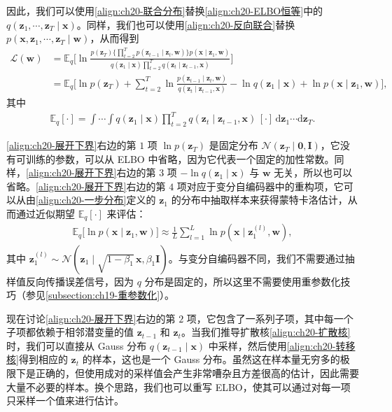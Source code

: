 \documentclass[../../main.tex]{subfiles}
\begin{document}
因此，我们可以使用\eqref{align:ch20-联合分布}替换\eqref{align:ch20-ELBO恒等}中的 $q(\bm{z}_1,\cdots,\bm{z}_T\mid\bm{x})$。同样，我们也可以使用\eqref{align:ch20-反向联合}替换 $p(\bm{x},\bm{z}_1,\cdots,\bm{z}_T\mid\bm{w})$，从而得到
\begin{align}
\mathcal{L}(\bm{w})&=\mathbb{E}_{q}\Big[\ln\frac{p(\bm{z}_T)\Big\{\prod_{t=2}^{T}p(\bm{z}_{t-1}\mid\bm{z}_t,\bm{w})\Big\}p(\bm{x}\mid\bm{z}_1,\bm{w})}{q(\bm{z}_1\mid\bm{x})\prod_{t=2}^{T}q(\bm{z}_t\mid\bm{z}_{t-1},\bm{x})}\Big]\nonumber\\
&=\mathbb{E}_{q}\Big[\ln p(\bm{z}_T)+\sum_{t=2}^{T}\ln\frac{p(\bm{z}_{t-1}\mid\bm{z}_t,\bm{w})}{q(\bm{z}_t\mid\bm{z}_{t-1},\bm{x})}-\ln q(\bm{z}_1\mid\bm{x})+\ln p(\bm{x}\mid\bm{z}_1,\bm{w})\Big],
\label{align:ch20-展开下界}
\end{align}
其中
\begin{align}
\mathbb{E}_{q}[\cdot]=\int\cdots\int q(\bm{z}_1\mid\bm{x})\prod_{t=2}^{T}q(\bm{z}_t\mid\bm{z}_{t-1},\bm{x})\,[\cdot]\,\mathrm{d}\bm{z}_1\cdots\mathrm{d}\bm{z}_T.
\label{align:ch20-期望定义}
\end{align}

\eqref{align:ch20-展开下界}右边的第 $1$ 项 $\ln p(\bm{z}_T)$ 是固定分布 $\mathcal{N}(\bm{z}_T\mid\bm{0},\bm{I})$，它没有可训练的参数，可以从 ELBO 中省略，因为它代表一个固定的加性常数。同样，\eqref{align:ch20-展开下界}右边的第 $3$ 项 $-\ln q(\bm{z}_1\mid\bm{x})$ 与 $\bm{w}$ 无关，所以也可以省略。\eqref{align:ch20-展开下界}右边的第 $4$ 项对应于变分自编码器中的重构项，它可以从由\eqref{align:ch20-一步分布}定义的 $\bm{z}_1$ 的分布中抽取样本来获得蒙特卡洛估计，从而通过近似期望 $\mathbb{E}_{q}[\cdot]$ 来评估：
\begin{align}
\mathbb{E}_{q}\big[\ln p(\bm{x}\mid\bm{z}_1,\bm{w})\big]\approx\frac{1}{L}\sum_{l=1}^{L}\ln p(\bm{x}\mid\bm{z}_1^{(l)},\bm{w}),
\label{align:ch20-重构估计}
\end{align}
其中 $\bm{z}_1^{(l)}\sim\mathcal{N}(\bm{z}_1\mid\sqrt{1-\beta_1}\,\bm{x},\beta_1\bm{I})$。与变分自编码器不同，我们不需要通过抽样值反向传播误差信号，因为 $q$ 分布是固定的，所以这里不需要使用重参数化技巧（参见\cref{subsection:ch19-重参数化}）。

现在讨论\eqref{align:ch20-展开下界}右边的第 $2$ 项，它包含了一系列子项，其中每一个子项都依赖于相邻潜变量的值 $\bm{z}_{t-1}$ 和 $\bm{z}_t$。当我们推导扩散核\eqref{align:ch20-扩散核}时，我们可以直接从 Gauss 分布 $q(\bm{z}_{t-1}\mid\bm{x})$ 中采样，然后使用\eqref{align:ch20-转移核}得到相应的 $\bm{z}_t$ 的样本，这也是一个 Gauss 分布。虽然这在样本量无穷多的极限下是正确的，但使用成对的采样值会产生非常嘈杂且方差很高的估计，因此需要大量不必要的样本。换个思路，我们也可以重写 ELBO，使其可以通过对每一项只采样一个值来进行估计。
\end{document}
